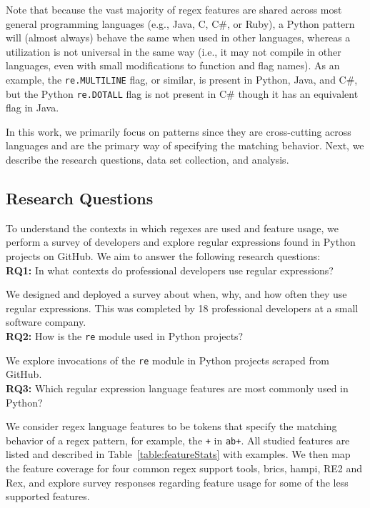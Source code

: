 Note that because the vast majority of regex features are shared across most general programming languages (e.g., Java, C, C\#, or Ruby), a Python {pattern} will (almost always) behave the same when used in other languages, whereas a utilization is not universal in the same way (i.e., it may not compile in other languages, even with small modifications to function and flag names).
As an example, the {\tt re.MULTILINE} flag, or similar, is present in Python, Java, and C\#, but  the Python {\tt re.DOTALL} flag is not present in C\# though it has an equivalent flag in Java.

In this work, we primarily focus on patterns since they are cross-cutting across languages and are the primary way of specifying the matching behavior. Next, we describe the research questions, data set collection, and analysis.

\subsection{Research Questions}
\label{sec:rqs}
To understand the contexts in which regexes are used  and feature usage, we perform a survey of developers and explore regular expressions found in Python projects on GitHub. We aim to answer the following research questions:\\

\noindent \textbf{RQ1:} In what contexts do professional developers use regular expressions?

We designed and deployed a survey about when, why, and how often they use regular expressions. This was completed by 18 professional developers at a small software company.\\

\noindent \textbf{RQ2:} How  is the {\tt re} module used in Python projects?

We explore invocations of  the {\tt re} module in  Python projects scraped from GitHub.\\

\noindent \textbf{RQ3:} Which regular expression language features are most commonly used in Python?

We consider regex language features to be tokens that specify the matching behavior of a regex pattern, for example,  the {\tt +} in {\tt ab+}.  All studied features are listed and described in Table~\ref{table:featureStats} with examples. We then map the feature coverage for four common regex support tools, brics, hampi, RE2 and Rex, and explore survey responses regarding feature usage for some of the less supported features.\\


